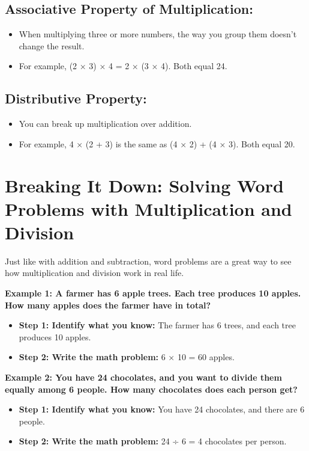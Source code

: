 \subsection{Associative Property of Multiplication:}
\begin{itemize}
    \item When multiplying three or more numbers, the way you group them doesn’t change the result.
    \item For example, (2 × 3) × 4 = 2 × (3 × 4). Both equal 24.
\end{itemize}

\subsection{Distributive Property:}
\begin{itemize}
    \item You can break up multiplication over addition.
    \item For example, 4 × (2 + 3) is the same as (4 × 2) + (4 × 3). Both equal 20.
\end{itemize}

\section{Breaking It Down: Solving Word Problems with Multiplication and Division}
Just like with addition and subtraction, word problems are a great way to see how multiplication and division work in real life.

\textbf{Example 1: A farmer has 6 apple trees. Each tree produces 10 apples. How many apples does the farmer have in total?}
\begin{itemize}
    \item \textbf{Step 1: Identify what you know:}
        The farmer has 6 trees, and each tree produces 10 apples.
    \item \textbf{Step 2: Write the math problem:}
        6 × 10 = 60 apples.    
\end{itemize}

\textbf{Example 2: You have 24 chocolates, and you want to divide them equally among 6 people. How many chocolates does each person get?}
\begin{itemize}
    \item \textbf{Step 1: Identify what you know:}
        You have 24 chocolates, and there are 6 people.
    \item \textbf{Step 2: Write the math problem:}
        24 ÷ 6 = 4 chocolates per person.
\end{itemize}

